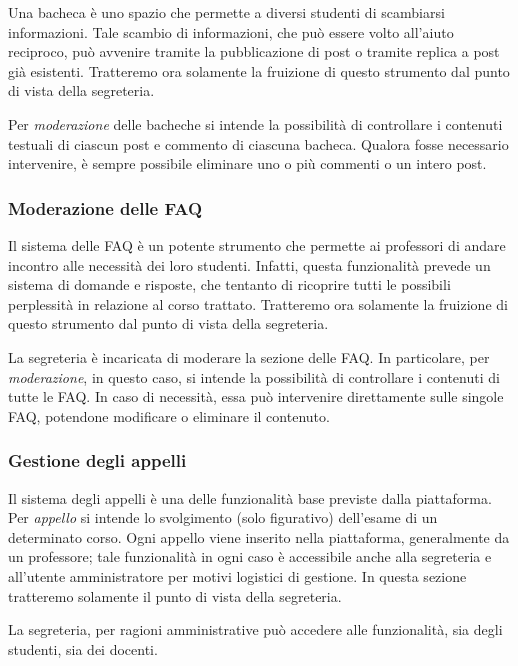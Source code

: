 \documentclass [a4paper,11pt]{book}
\begin{document}
Una bacheca è uno spazio che permette a diversi studenti di scambiarsi informazioni. Tale scambio di informazioni, che può essere volto all'aiuto reciproco, può avvenire tramite la pubblicazione di post o tramite replica a post già esistenti. Tratteremo ora solamente la fruizione di questo strumento dal punto di vista della segreteria.

Per \emph{moderazione} delle bacheche si intende la possibilità di controllare i contenuti testuali di ciascun post e commento di ciascuna bacheca. Qualora fosse necessario intervenire, è sempre possibile eliminare uno o più commenti o un intero post. 

\medskip

\subsubsection{Moderazione delle FAQ}

Il sistema delle FAQ è un potente strumento che permette ai professori di andare incontro alle necessità dei loro studenti. Infatti, questa funzionalità prevede un sistema di domande e risposte, che tentanto di ricoprire tutti le possibili perplessità in relazione al corso trattato. Tratteremo ora solamente la fruizione di questo strumento dal punto di vista della segreteria.

La segreteria è incaricata di moderare la sezione delle FAQ. In particolare, per \emph{moderazione}, in questo caso, si intende la possibilità di controllare i contenuti di tutte le FAQ. In caso di necessità, essa può intervenire direttamente sulle singole FAQ, potendone modificare o eliminare il contenuto. 


\medskip

\subsubsection{Gestione degli appelli}

Il sistema degli appelli è una delle funzionalità base previste dalla piattaforma. Per \emph{appello} si intende lo svolgimento (solo figurativo) dell'esame di un determinato corso. Ogni appello viene inserito nella piattaforma, generalmente da un professore; tale funzionalità in ogni caso è accessibile anche alla segreteria e all'utente amministratore per motivi logistici di gestione. In questa sezione tratteremo solamente il punto di vista della segreteria.

La segreteria, per ragioni amministrative può accedere alle funzionalità, sia degli studenti, sia dei docenti.
\medskip
\end{document}
